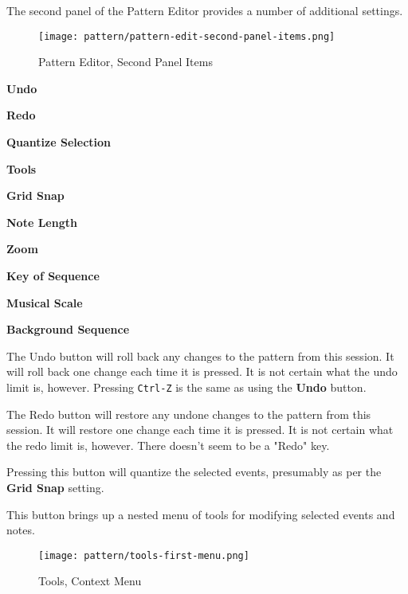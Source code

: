    The second panel of the Pattern Editor provides a number of additional
   settings.

\begin{figure}[H]
   \centering 
   \texttt{[image: pattern/pattern-edit-second-panel-items.png]}
   \caption{Pattern Editor, Second Panel Items}
   \label{fig:pattern_editor_main_panel_items}
\end{figure}

   \begin{enumber}
      \item \textbf{Undo}
      \item \textbf{Redo}
      \item \textbf{Quantize Selection}
      \item \textbf{Tools}
      \item \textbf{Grid Snap}
      \item \textbf{Note Length}
      \item \textbf{Zoom}
      \item \textbf{Key of Sequence}
      \item \textbf{Musical Scale}
      \item \textbf{Background Sequence}
   \end{enumber}

   \setcounter{ItemCounter}{0}      %

   The Undo button will roll back any changes to the pattern from this
   session.
   It will roll back one change each time it is pressed.
   It is not certain what the undo limit is, however.
   Pressing \texttt{Ctrl-Z} is the same as using the \textbf{Undo} button.

   The Redo button will restore any undone changes to the pattern from this
   session.
   It will restore one change each time it is pressed.
   It is not certain what the redo limit is, however.
   There doesn't seem to be a "Redo" key.

   Pressing this button will quantize the selected events, presumably as per
   the \textbf{Grid Snap} setting.

   This button brings up a nested menu of tools for modifying selected
   events and notes.

\begin{figure}[H]
   \centering 
   \texttt{[image: pattern/tools-first-menu.png]}
   \caption{Tools, Context Menu}
   \label{fig:pattern_editor_tools_first_menu}
\end{figure}

